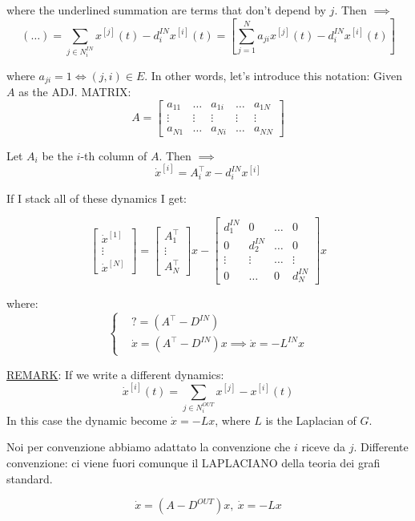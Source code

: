 where the underlined summation are terms that don't depend by $j$. Then $\implies$
\[
	(\dots) = \sum_{j\in N_i^{IN}}{x^{[j]}(t)} - d_i^{IN}x^{[i]}(t) = [\sum_{j=1}^N{a_{ji}x^{[j]}(t)} -  d_i^{IN}x^{[i]}(t)]
\]

where $a_{ji}=1 \iff (j,i)\in E$. In other words, let's introduce this notation: Given $A$ as the ADJ. MATRIX:
\[
	A = \begin{bmatrix}a_{11}&\dots &a_{1i}& \dots & a_{1N}\\ \vdots & \vdots & \vdots & \vdots & \vdots \\ a_{N1}&\dots & a_{Ni} & \dots & a_{NN}\end{bmatrix}
\]

Let $A_i$ be the $i$-th column of $A$. Then $\implies$
\[
	\dot{x}^{[i]} = A_i^\top x -d_i^{IN}x^{[i]}
\]

If I stack all of these dynamics I get:

\[
	\begin{bmatrix}\dot{x}^{[1]}\\ \vdots\\ \dot{x}^{[N]}\end{bmatrix} = \begin{bmatrix}A_1^\top \\ \vdots\\ A_N^\top\end{bmatrix}x - \begin{bmatrix}d_1^{IN}&0&\dots & 0\\0&d_2^{IN}&\dots & 0\\ \vdots & \vdots & \dots & \vdots\\0&\dots &0&d_N^{IN}\end{bmatrix}x
\]

where:
\[
	\left\{
	\begin{aligned}
	&? = (A^\top - D^{IN}) \\
	&\dot{x} = (A^\top - D^{IN})x \implies \dot{x} = -L^{IN}x 
	\end{aligned} 
	\right.
\]

\underline{REMARK}: If we write a different dynamics:
\[
	\dot{x}^{[i]}(t) = \sum_{j\in N_i^{OUT}}{x^{[j]} - x^{[i]}(t)}
\]
In this case the dynamic become $\dot{x}=-Lx$, where $L$ is the Laplacian of $G$.

Noi per convenzione abbiamo adattato la convenzione che $i$ riceve da $j$. Differente convenzione: ci viene fuori comunque il LAPLACIANO della teoria dei grafi standard.

\[
	\dot{x} = (A - D^{OUT})x,\ \dot{x}=-Lx
\]

